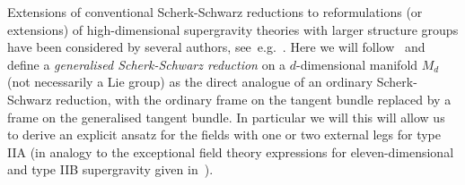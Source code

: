 \documentclass[debug]{phd}
\begin{document}
				Extensions of conventional Scherk-Schwarz reductions to reformulations (or extensions) of high-dimensional supergravity theories with larger structure groups have been considered by several authors, see~e.g.~\cite{Riccioni:2007au,Berman:2012uy,Aldazabal:2013mya,Godazgar:2013dma,spheres,Hohm:2014qga,Ciceri:2014wya,SamtExcReview,Baguet:2015sma,Malek:2015hma}. 
				Here we will follow~\cite{spheres} and define a \emph{generalised Scherk-Schwarz reduction} on a $d$-dimensional manifold $M_d$ (not necessarily a Lie group) as the direct analogue of an ordinary Scherk-Schwarz reduction, with the ordinary frame on the tangent bundle replaced by a frame on the generalised tangent bundle.
				In particular we will this will allow us to derive an explicit ansatz for the fields with one or two external legs for type IIA (in analogy to the exceptional field theory expressions for eleven-dimensional and type IIB supergravity given in~\cite{Hohm:2014qga,SamtExcReview,Baguet:2015sma}).
				
\end{document}
